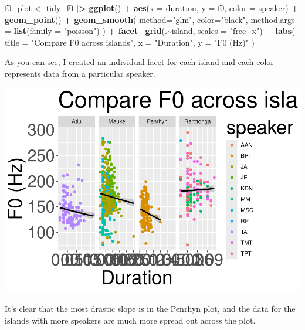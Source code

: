 \documentclass[
  ,man,floatsintext]{apa6}
\newenvironment{Shaded}{\begin{snugshade}}{\end{snugshade}}
\newcommand{\AttributeTok}[1]{\textcolor[rgb]{0.13,0.29,0.53}{#1}}
\newcommand{\FunctionTok}[1]{\textcolor[rgb]{0.13,0.29,0.53}{\textbf{#1}}}
\newcommand{\NormalTok}[1]{#1}
\newcommand{\OtherTok}[1]{\textcolor[rgb]{0.56,0.35,0.01}{#1}}
\newcommand{\SpecialCharTok}[1]{\textcolor[rgb]{0.81,0.36,0.00}{\textbf{#1}}}
\newcommand{\StringTok}[1]{\textcolor[rgb]{0.31,0.60,0.02}{#1}}
\begin{document}
\begin{Shaded}
\begin{Highlighting}[]
\NormalTok{f0\_plot }\OtherTok{\textless{}{-}}\NormalTok{ tidy\_f0 }\SpecialCharTok{|\textgreater{}}
  \FunctionTok{ggplot}\NormalTok{() }\SpecialCharTok{+} 
  \FunctionTok{aes}\NormalTok{(}\AttributeTok{x =}\NormalTok{ duration, }\AttributeTok{y =}\NormalTok{ f0, }\AttributeTok{color =}\NormalTok{ speaker) }\SpecialCharTok{+}
  \FunctionTok{geom\_point}\NormalTok{() }\SpecialCharTok{+}
  \FunctionTok{geom\_smooth}\NormalTok{(}
    \AttributeTok{method=}\StringTok{"glm"}\NormalTok{,}
    \AttributeTok{color=}\StringTok{"black"}\NormalTok{,}
    \AttributeTok{method.args =} \FunctionTok{list}\NormalTok{(}\AttributeTok{family =} \StringTok{"poisson"}\NormalTok{)}
\NormalTok{  ) }\SpecialCharTok{+}
  \FunctionTok{facet\_grid}\NormalTok{(.}\SpecialCharTok{\textasciitilde{}}\NormalTok{island,}
             \AttributeTok{scales =} \StringTok{"free\_x"}\NormalTok{) }\SpecialCharTok{+}
  \FunctionTok{labs}\NormalTok{(}
    \AttributeTok{title =} \StringTok{"Compare F0 across islands"}\NormalTok{, }
    \AttributeTok{x =} \StringTok{"Duration"}\NormalTok{, }
    \AttributeTok{y =} \StringTok{"F0 (Hz)"}
\NormalTok{  ) }
\end{Highlighting}
\end{Shaded}

As you can see, I created an individual facet for each island and each color represents data from a particular speaker.

\includegraphics{D2_CIM_files/figure-latex/print-f0-plot-1.pdf}

It's clear that the most drastic slope is in the Penrhyn plot, and the data for the islands with more speakers are much more spread out across the plot.
\end{document}
